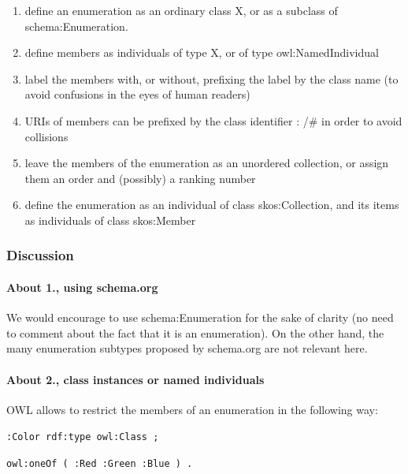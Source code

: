 \documentclass[
  11pt,
]{article}
\providecommand{\tightlist}{%
  \setlength{\itemsep}{0pt}\setlength{\parskip}{0pt}}
\begin{document}
\begin{enumerate}
\def\labelenumi{\arabic{enumi}.}
\tightlist
\item
  define an enumeration as an ordinary class X, or as a subclass of
  schema:Enumeration.
\item
  define members as individuals of type X, or of type
  owl:NamedIndividual
\item
  label the members with, or without, prefixing the label by the class
  name (to avoid confusions in the eyes of human readers)
\item
  URIs of members can be prefixed by the class identifier : /\# in order
  to avoid collisions
\item
  leave the members of the enumeration as an unordered collection, or
  assign them an order and (possibly) a ranking number
\item
  define the enumeration as an individual of class skos:Collection, and
  its items as individuals of class skos:Member
\end{enumerate}

\hypertarget{discussion}{%
\subsubsection{Discussion}\label{discussion}}

\hypertarget{about-1.-using-schema.org}{%
\paragraph{About 1., using schema.org}\label{about-1.-using-schema.org}}

We would encourage to use schema:Enumeration for the sake of clarity (no
need to comment about the fact that it is an enumeration). On the other
hand, the many enumeration subtypes proposed by schema.org are not
relevant here.

\hypertarget{about-2.-class-instances-or-named-individuals}{%
\paragraph{About 2., class instances or named
individuals}\label{about-2.-class-instances-or-named-individuals}}

OWL allows to restrict the members of an enumeration in the following
way:

\texttt{:Color\ rdf:type\ owl:Class\ ;}

\texttt{owl:oneOf\ (\ :Red\ :Green\ :Blue\ )\ .}
\end{document}
